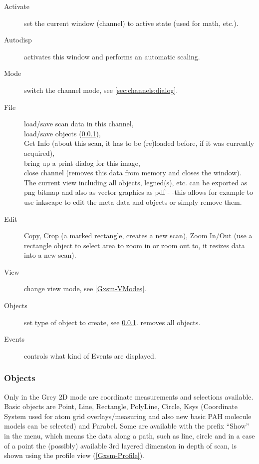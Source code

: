 \begin{description}
\item[Activate] set the current window (channel) to active state (used for math, etc.).
\item[Autodisp] activates this window and performs an automatic scaling.
\item[Mode] switch the channel mode, see \ref{sec:channels:dialog}.
\item[File] load/save scan data in this channel,\\ load/save objects
  (\ref{Gxsm-VObjects}),\\ Get Info (about this scan, it has to be
  (re)loaded before, if it was currently acquired),\\ bring up a print
  dialog for this image,\\ close channel (removes this data from
  memory and closes the window).\\ The current view including all
  objects, legned(s), etc. can be exported as png bitmap and also as
  vector graphics as pdf - -this allows for example to use inkscape to
  edit the meta data and objects or simply remove them.
\item[Edit] Copy, Crop (a marked rectangle, creates a new scan), Zoom
  In/Out (use a rectangle object to select area to zoom in or zoom out
  to, it resizes data into a new scan).
\item[View] change view mode, see \ref{Gxsm-VModes}.
\item[Objects] set type of object to create, see \ref{Gxsm-VObjects}.  removes all objects.
\item[Events] controls what kind of Events are displayed.
\end{description}


\subsubsection{Objects}
\label{Gxsm-VObjects}
Only in the Grey 2D mode are coordinate measurements and selections
available. Basic objects are Point, Line, Rectangle, PolyLine, Circle,
Ksys (Coordinate System used for atom grid overlays/measuring and also
new basic PAH molecule models can be selected) and Parabel. Some are
available with the prefix ``Show'' in the menu, which means the data
along a path, such as line, circle and in a case of a point the
(possibly) available 3rd layered dimension in depth of scan, is shown
using the profile view (\ref{Gxsm-Profile}).

